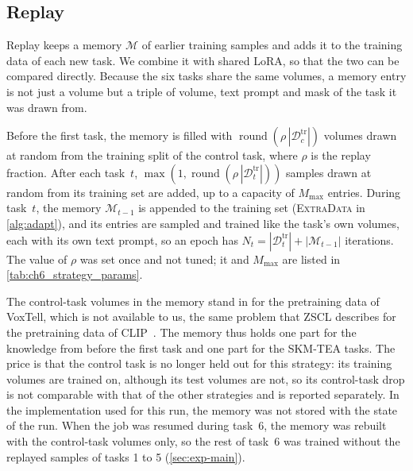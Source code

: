 \subsection{Replay}
\label{subsec:method-replay}

Replay keeps a memory $\mathcal{M}$ of earlier training samples and adds it to the training data of each new task.
We combine it with shared LoRA, so that the two can be compared directly.
Because the six tasks share the same volumes, a memory entry is not just a volume but a triple of volume, text prompt and mask of the task it was drawn from.

Before the first task, the memory is filled with $\operatorname{round}(\rho \, |\mathcal{D}_c^{\mathrm{tr}}|)$ volumes drawn at random from the training split of the control task, where $\rho$ is the replay fraction.
After each task~$t$, $\max(1, \operatorname{round}(\rho \, |\mathcal{D}_t^{\mathrm{tr}}|))$ samples drawn at random from its training set are added, up to a capacity of $M_{\max}$ entries.
During task~$t$, the memory $\mathcal{M}_{t-1}$ is appended to the training set (\textsc{ExtraData} in \cref{alg:adapt}), and its entries are sampled and trained like the task's own volumes, each with its own text prompt, so an epoch has $N_t = |\mathcal{D}_t^{\mathrm{tr}}| + |\mathcal{M}_{t-1}|$ iterations.
The value of $\rho$ was set once and not tuned; it and $M_{\max}$ are listed in \cref{tab:ch6_strategy_params}.

The control-task volumes in the memory stand in for the pretraining data of VoxTell, which is not available to us, the same problem that ZSCL describes for the pretraining data of CLIP~\cite{zheng2023preventingzeroshottransferdegradation}.
The memory thus holds one part for the knowledge from before the first task and one part for the SKM-TEA tasks.
The price is that the control task is no longer held out for this strategy: its training volumes are trained on, although its test volumes are not, so its control-task drop is not comparable with that of the other strategies and is reported separately.
In the implementation used for this run, the memory was not stored with the state of the run.
When the job was resumed during task~6, the memory was rebuilt with the control-task volumes only, so the rest of task~6 was trained without the replayed samples of tasks 1 to 5 (\cref{sec:exp-main}).


